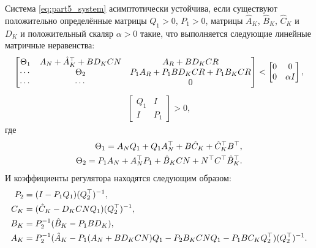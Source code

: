 \begin{theorem}
	Система \eqref{eq:part5_system} асимптотически устойчива, если существуют положительно определённые матрицы ${Q}_1>0$, ${P}_1>0$, матрицы $\hat{{A}}_K$,  $\hat{{B}}_K$, $\hat{{C}}_K$ и $D_K$
	и положительный скаляр $\alpha>0$ такие, что выполняется следующие линейные матричные неравенства:
		\begin{align}\label{eq:part5_finalLMI}
		\begin{bmatrix}
			{\Theta}_1  & {A}_N + {\hat{A}}_K^\top +{B}{D}_K{C}{N} & {A}_R + {B}{D}_K{C}{R}\\
			\cdots & {\Theta}_2 & {P}_{1}{A}_R + {P}_{1}{B}{D}_K{C}{R}+{P}_1{B}_K{C}{R}\\
			\cdots & \cdots & 0 
		\end{bmatrix} < 
		\begin{bmatrix}
			0 & 0\\
			0 & \alpha {I}
		\end{bmatrix},
	\end{align}
		\begin{align}\label{eq: condition}
		\begin{bmatrix} 
			{Q}_{1} & I \\ 
			I & {P}_{1}
		\end{bmatrix} > 0,
	\end{align}
	где
	\begin{align}
		{\Theta}_1 = {A}_N{Q}_{1} +{Q}_{1}{A}_N^\top + {B}{\hat{C}}_K +{\hat{C}}_K^\top{B}^\top, \\
		{\Theta}_2 = {P}_{1}{A}_N +{A}_N^\top{P}_{1}+{\hat{B}}_K{C}{N}+{N}^\top{C}^\top{\hat{B}}_K^\top.
	\end{align}
	И коэффициенты регулятора находятся следующим образом: 
	\begin{align}
		{P}_{2} &= ({I}-{P}_{1}{Q}_{1})({Q}_{2}^\top)^{-1},\\
		{C}_K &= ({\hat{C}}_K - {D}_K {C} {N} {Q}_{1} ) ({Q}_{2}^\top)^{-1},\\
		{B}_K &= {P}_{2}^{-1}({\hat{B}}_K- {P}_{1}{B}{D}_K),\\
		{A}_K &= {P}_{2}^{-1}({\hat{A}}_K-{P}_{1}({A}_N+{B}{D}_K{C}{N}){Q}_{1} - {P}_{2}{B}_K{C}{N}{Q}_{1}-{P}_{1} {B}{C}_K{Q}_{2}^\top)({Q}_{2}^\top)^{-1}.
	\end{align}
\end{theorem}
